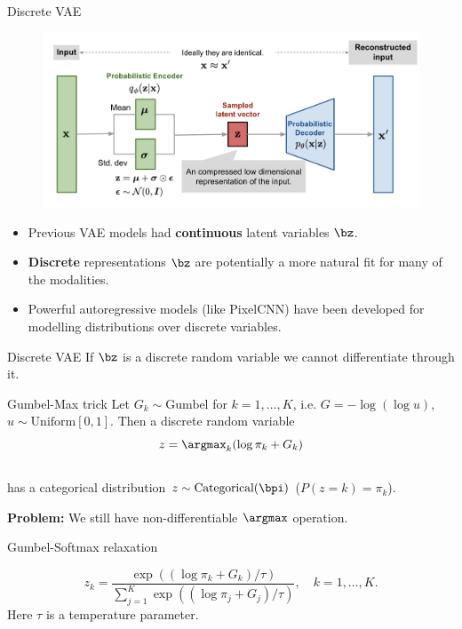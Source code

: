 \begin{frame}{Discrete VAE}
	\begin{figure}[h]
		\centering
		\includegraphics[width=\linewidth]{figs/vae-gaussian.png}
	\end{figure}
	\begin{itemize}
		\item Previous VAE models had \textbf{continuous} latent variables $\bz$.
		\item \textbf{Discrete} representations $\bz$ are potentially a more natural fit for many of the modalities.
		\item Powerful autoregressive models (like PixelCNN) have been developed for modelling distributions over discrete variables.
	\end{itemize}
\end{frame}
\begin{frame}{Discrete VAE}
	If $\bz$ is a discrete random variable we cannot differentiate through it.
	
	\begin{block}{Gumbel-Max trick}
		Let $G_k \sim \text{Gumbel}$ for $k = 1, \dots, K$, i.e. $G = - \log (\log u)$, $u \sim \text{Uniform}[0, 1]$. Then a discrete random variable
		\vspace{-0.2cm}
		\[
			z = \argmax_k (\log \pi_k + G_k)
		\]
		\vspace{-0.5cm} \\
		has a categorical distribution $z \sim \text{Categorical}(\bpi)$ ($P(z = k) = \pi_k$).
	\end{block}
	\textbf{Problem:} We still have non-differentiable $\argmax$ operation.
	\begin{block}{Gumbel-Softmax relaxation}
		
		\[
			z_k = \frac{\exp ((\log \pi_k + G_k) / \tau)}{\sum_{j=1}^K \exp ((\log \pi_j + G_j) / \tau)}, \quad k = 1, \dots, K.
		\]
		Here $\tau$ is a temperature parameter.
 	\end{block}
\end{frame}%
